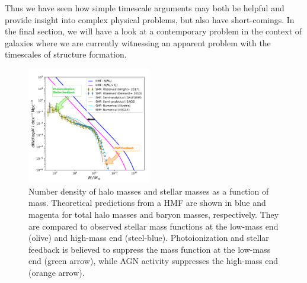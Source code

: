 \documentclass[useAMS,usenatbib,bibyear]{aa}
\newcommand{\red}[1]{\textcolor{red}{\textbf{#1}}}
\begin{document}
Thus we have seen how simple timescale arguments may both be helpful and provide insight into complex physical problems, but also have short-comings. In the final section, we will have a look at a contemporary problem in the context of galaxies where we are currently witnessing an apparent problem with the timescales of structure formation.

\begin{figure}[!t]
    \centering
    \includegraphics [width=0.48\textwidth] {hmf2smf-annotated.pdf}
    \caption{Number density of halo masses and stellar masses as a function of mass.
    Theoretical predictions from a HMF are shown in blue and magenta for total halo masses and baryon masses, respectively.
    They are compared to observed stellar mass functions at the low-mass end (olive) and high-mass end (steel-blue).
    Photoionization and stellar feedback is believed to suppress the mass function at the low-mass end (green arrow), while AGN activity suppresses the high-mass end (orange arrow).}
    \label{fig:hmf2smf}
\end{figure}


\end{document}
